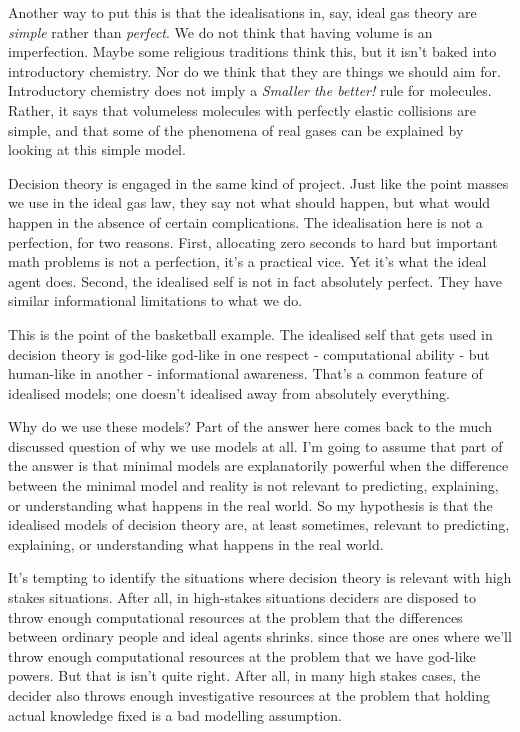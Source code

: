\documentclass[
  11pt,
  letterpaper,
  DIV=11,
  numbers=noendperiod,
  twoside]{scrartcl}
\begin{document}
Another way to put this is that the idealisations in, say, ideal gas
theory are \emph{simple} rather than \emph{perfect}. We do not think
that having volume is an imperfection. Maybe some religious traditions
think this, but it isn't baked into introductory chemistry. Nor do we
think that they are things we should aim for. Introductory chemistry
does not imply a \emph{Smaller the better!} rule for molecules. Rather,
it says that volumeless molecules with perfectly elastic collisions are
simple, and that some of the phenomena of real gases can be explained by
looking at this simple model.

Decision theory is engaged in the same kind of project. Just like the
point masses we use in the ideal gas law, they say not what should
happen, but what would happen in the absence of certain complications.
The idealisation here is not a perfection, for two reasons. First,
allocating zero seconds to hard but important math problems is not a
perfection, it's a practical vice. Yet it's what the ideal agent does.
Second, the idealised self is not in fact absolutely perfect. They have
similar informational limitations to what we do.

This is the point of the basketball example. The idealised self that
gets used in decision theory is god-like god-like in one respect -
computational ability - but human-like in another - informational
awareness. That's a common feature of idealised models; one doesn't
idealised away from absolutely everything.

Why do we use these models? Part of the answer here comes back to the
much discussed question of why we use models at all. I'm going to assume
that part of the answer is that minimal models are explanatorily
powerful when the difference between the minimal model and reality is
not relevant to predicting, explaining, or understanding what happens in
the real world. So my hypothesis is that the idealised models of
decision theory are, at least sometimes, relevant to predicting,
explaining, or understanding what happens in the real world.

It's tempting to identify the situations where decision theory is
relevant with high stakes situations. After all, in high-stakes
situations deciders are disposed to throw enough computational resources
at the problem that the differences between ordinary people and ideal
agents shrinks. since those are ones where we'll throw enough
computational resources at the problem that we have god-like powers. But
that is isn't quite right. After all, in many high stakes cases, the
decider also throws enough investigative resources at the problem that
holding actual knowledge fixed is a bad modelling assumption.
\end{document}
